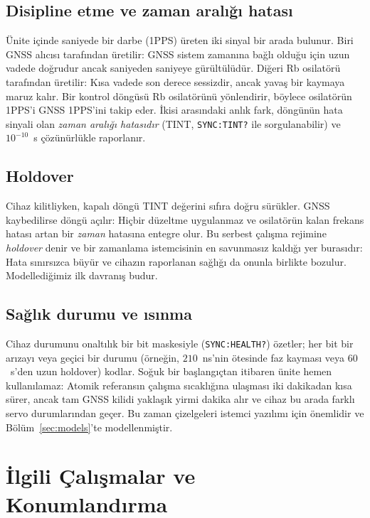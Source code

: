 \documentclass[conference]{IEEEtran}
\begin{document}
\subsection{Disipline etme ve zaman aralığı hatası}
Ünite içinde saniyede bir darbe (1PPS) üreten iki sinyal bir arada bulunur. Biri GNSS alıcısı tarafından üretilir: GNSS sistem zamanına bağlı olduğu için uzun vadede doğrudur ancak saniyeden saniyeye gürültülüdür. Diğeri Rb osilatörü tarafından üretilir: Kısa vadede son derece sessizdir, ancak yavaş bir kaymaya maruz kalır. Bir kontrol döngüsü Rb osilatörünü yönlendirir, böylece osilatörün 1PPS'i GNSS 1PPS'ini takip eder. İkisi arasındaki anlık fark, döngünün hata sinyali olan \emph{zaman aralığı hatasıdır} (TINT, \texttt{SYNC:TINT?} ile sorgulanabilir) ve $10^{-10}$~s çözünürlükle raporlanır.

\subsection{Holdover}
Cihaz kilitliyken, kapalı döngü TINT değerini sıfıra doğru sürükler. GNSS kaybedilirse döngü açılır: Hiçbir düzeltme uygulanmaz ve osilatörün kalan frekans hatası artan bir \emph{zaman} hatasına entegre olur. Bu serbest çalışma rejimine \emph{holdover} denir ve bir zamanlama istemcisinin en savunmasız kaldığı yer burasıdır: Hata sınırsızca büyür ve cihazın raporlanan sağlığı da onunla birlikte bozulur. Modellediğimiz ilk davranış budur.

\subsection{Sağlık durumu ve ısınma}
Cihaz durumunu onaltılık bir bit maskesiyle (\texttt{SYNC:HEALTH?}) özetler; her bit bir arızayı veya geçici bir durumu (örneğin, $210$~ns'nin ötesinde faz kayması veya $60$~s'den uzun holdover) kodlar. Soğuk bir başlangıçtan itibaren ünite hemen kullanılamaz: Atomik referansın çalışma sıcaklığına ulaşması iki dakikadan kısa sürer, ancak tam GNSS kilidi yaklaşık yirmi dakika alır ve cihaz bu arada farklı servo durumlarından geçer. Bu zaman çizelgeleri istemci yazılımı için önemlidir ve Bölüm~\ref{sec:models}'te modellenmiştir.

\section{İlgili Çalışmalar ve Konumlandırma}
\label{sec:related}
\end{document}
